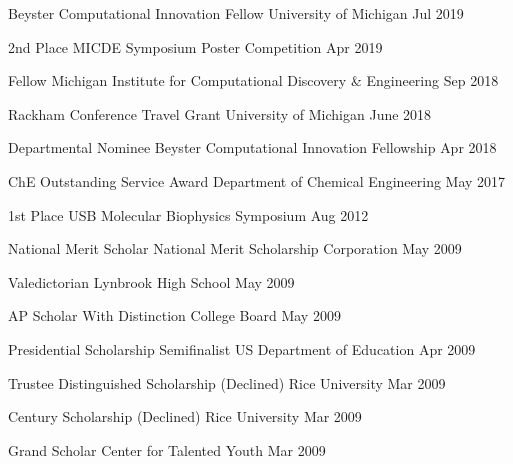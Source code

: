 \begin{cvhonors}  \cvhonor
    {Beyster Computational Innovation Fellow} %
    {University of Michigan} %
    {} %
    {Jul 2019} %

  \cvhonor
    {2nd Place} %
    {MICDE Symposium Poster Competition} %
    {} %
    {Apr 2019} %

  \cvhonor
    {Fellow} %
    {Michigan Institute for Computational Discovery \& Engineering} %
    {} %
    {Sep 2018} %

  \cvhonor
    {Rackham Conference Travel Grant} %
    {University of Michigan} %
    {} %
    {June 2018} %

  \cvhonor
    {Departmental Nominee} %
    {Beyster Computational Innovation Fellowship} %
    {} %
    {Apr 2018} %

  \cvhonor
    {ChE Outstanding Service Award} %
    {Department of Chemical Engineering} %
    {} %
    {May 2017} %

  \cvhonor
    {1st Place} %
    {USB Molecular Biophysics Symposium} %
    {} %
    {Aug 2012} %

  \cvhonor
    {National Merit Scholar} %
    {National Merit Scholarship Corporation} %
    {} %
    {May 2009} %

  \cvhonor
    {Valedictorian} %
    {Lynbrook High School} %
    {} %
    {May 2009} %

  \cvhonor
    {AP Scholar With Distinction} %
    {College Board} %
    {} %
    {May 2009} %

  \cvhonor
    {Presidential Scholarship Semifinalist} %
    {US Department of Education} %
    {} %
    {Apr 2009} %

  \cvhonor
    {Trustee Distinguished Scholarship (Declined)} %
    {Rice University} %
    {} %
    {Mar 2009} %

  \cvhonor
    {Century Scholarship (Declined)} %
    {Rice University} %
    {} %
    {Mar 2009} %

  \cvhonor
    {Grand Scholar} %
    {Center for Talented Youth} %
    {} %
    {Mar 2009} %

\end{cvhonors}